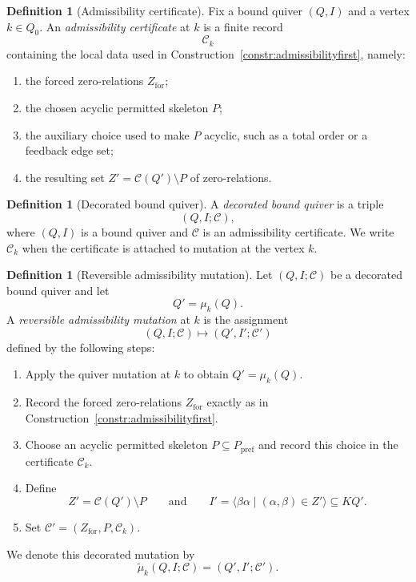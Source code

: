 \documentclass[11pt]{article}
\theoremstyle{plain}
\theoremstyle{definition}
\newtheorem{definition}[theorem]{Definition}
\theoremstyle{remark}
\begin{document}
\begin{definition}[Admissibility certificate]
Fix a bound quiver \((Q,I)\) and a vertex \(k\in Q_0\).  An
\emph{admissibility certificate} at \(k\) is a finite record
\[
\mathcal C_k
\]
containing the local data used in Construction~\ref{constr:admissibilityfirst},
namely:
\begin{enumerate}[label=\textup{(\arabic*)},leftmargin=2.5em]
  \item the forced zero-relations \(Z_{\mathrm{for}}\);
  \item the chosen acyclic permitted skeleton \(P\);
  \item the auxiliary choice used to make \(P\) acyclic, such as a total
  order or a feedback edge set;
  \item the resulting set \(Z'=\mathcal C(Q')\setminus P\) of zero-relations.
\end{enumerate}
\end{definition}

\begin{definition}[Decorated bound quiver]
A \emph{decorated bound quiver} is a triple
\[
(Q,I;\mathcal C),
\]
where \((Q,I)\) is a bound quiver and \(\mathcal C\) is an admissibility
certificate.  We write \(\mathcal C_k\) when the certificate is attached to
mutation at the vertex \(k\).
\end{definition}

\begin{definition}[Reversible admissibility mutation]
Let \((Q,I;\mathcal C)\) be a decorated bound quiver and let
\[
Q'=\mu_k(Q).
\]
A \emph{reversible admissibility mutation} at \(k\) is the assignment
\[
(Q,I;\mathcal C)\longmapsto (Q',I';\mathcal C')
\]
defined by the following steps:
\begin{enumerate}[label=\textbf{Step \arabic*.},leftmargin=3em]
  \item Apply the quiver mutation at \(k\) to obtain \(Q'=\mu_k(Q)\).
  \item Record the forced zero-relations \(Z_{\mathrm{for}}\) exactly as in
  Construction~\ref{constr:admissibilityfirst}.
  \item Choose an acyclic permitted skeleton \(P\subseteq P_{\mathrm{pref}}\)
  and record this choice in the certificate \(\mathcal C_k\).
  \item Define
  \[
    Z'=\mathcal C(Q')\setminus P
    \qquad\text{and}\qquad
    I'=\langle \beta\alpha \mid (\alpha,\beta)\in Z'\rangle\subseteq KQ'.
  \]
  \item Set \(\mathcal C'=(Z_{\mathrm{for}},P,\mathcal C_k)\).
\end{enumerate}
We denote this decorated mutation by
\[
\widetilde{\mu}_k(Q,I;\mathcal C)=(Q',I';\mathcal C').
\]
\end{definition}
\end{document}
